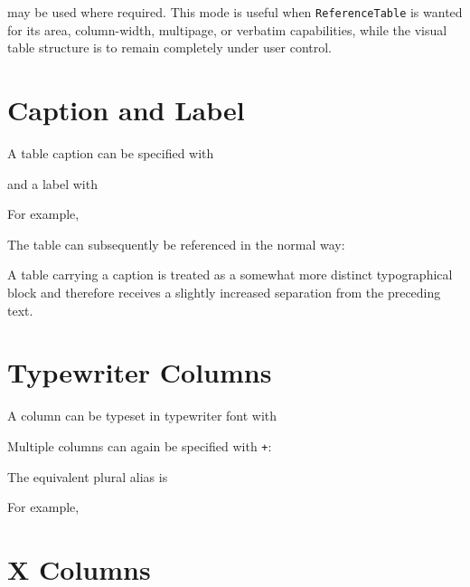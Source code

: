 \documentclass[
11pt,
a4paper,
oneside
]{scrbook}
\begin{document}


may be used where required.
This mode is useful when \texttt{ReferenceTable} is wanted for its area,
column-width, multipage, or verbatim capabilities, while the visual table
structure is to remain completely under user control.

\section{Caption and Label}

A table caption can be specified with




and a label with




For example,




The table can subsequently be referenced in the normal way:




A table carrying a caption is treated as a somewhat more distinct
typographical block and therefore receives a slightly increased separation
from the preceding text.

\section{Typewriter Columns}

A column can be typeset in typewriter font with




Multiple columns can again be specified with \texttt{+}:




The equivalent plural alias is




For example,






\section{X Columns}
\end{document}
